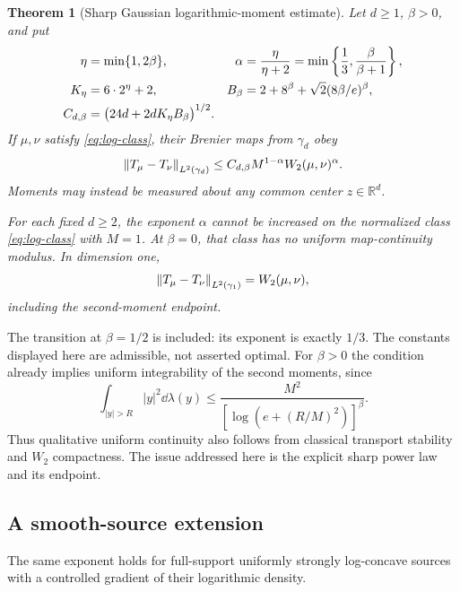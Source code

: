 \documentclass[11pt]{article}
\numberwithin{equation}{section}
\newtheorem{theorem}{Theorem}[section]
\theoremstyle{remark}\newtheorem{remark}[theorem]{Remark}
\newcommand{\R}{\mathbb R}\newcommand{\E}{\mathbb E}
\begin{document}
\begin{theorem}[Sharp Gaussian logarithmic-moment estimate]\label{thm:log}
Let $d\ge1$, $\beta>0$, and put
\begin{align}
 \eta&=\min\{1,2\beta\},&
 \alpha&=\frac\eta{\eta+2}=\min\left\{\frac13,\frac\beta{\beta+1}\right\},\label{eq:eta-alpha}\\
 K_\eta&=6\cdot2^\eta+2,&
 B_\beta&=2+8^\beta+\sqrt2(8\beta/e)^\beta,\label{eq:constants}\\
 C_{d,\beta}&=\bigl(24d+2dK_\eta B_\beta\bigr)^{1/2}.&&\notag
\end{align}
If $\mu,\nu$ satisfy \eqref{eq:log-class}, their Brenier maps from $\gamma_d$ obey
\begin{equation}\label{eq:main-log}
 \left\lVert T_\mu-T_\nu\right\rVert_{L^2(\gamma_d)}
 \le C_{d,\beta}M^{1-\alpha}W_2(\mu,\nu)^\alpha.
\end{equation}
Moments may instead be measured about any common center $z\in\R^d$.

For each fixed $d\ge2$, the exponent $\alpha$ cannot be increased on the normalized class \eqref{eq:log-class} with $M=1$. At $\beta=0$, that class has no uniform map-continuity modulus. In dimension one,
\begin{equation}\label{eq:one-dimensional}
 \left\lVert T_\mu-T_\nu\right\rVert_{L^2(\gamma_1)}=W_2(\mu,\nu),
\end{equation}
including the second-moment endpoint.
\end{theorem}

The transition at $\beta=1/2$ is included: its exponent is exactly $1/3$. The constants displayed here are admissible, not asserted optimal. For $\beta>0$ the condition already implies uniform integrability of the second moments, since
\[
 \int_{|y|>R}|y|^2\dd\lambda(y)
 \le\frac{M^2}{[\log(e+(R/M)^2)]^\beta}.
\]
Thus qualitative uniform continuity also follows from classical transport stability and $W_2$ compactness. The issue addressed here is the explicit sharp power law and its endpoint.

\subsection{A smooth-source extension}
The same exponent holds for full-support uniformly strongly log-concave sources with a controlled gradient of their logarithmic density.
\end{document}
